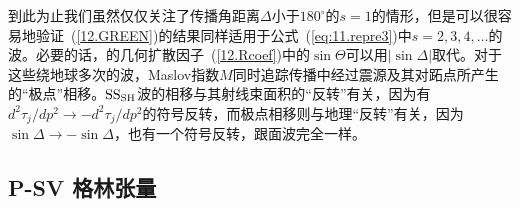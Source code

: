 到此为止我们虽然仅仅关注了传播角距离$\Delta$小于$180^{\circ}$的$s=1$的情形，但是可以很容易地验证~(\ref{12.GREEN})的结果同样适用于公式~(\ref{eq:11.repre3})中$s=2,3,4,\ldots$的波。必要的话，的几何扩散因子~(\ref{12.Rcoef})中的$\sin\Theta$可以用$|\!\sin\Delta|$取代。对于这些绕地球多次的波，Maslov指数$M$同时追踪传播中经过震源及其对跖点所产生的“极点”相移。${\rm SS}_{\rm SH}$波的相移与其射线束面积的“反转”有关，因为有$d^2\tau_j/dp^2\rightarrow -d^2\tau_j/dp^2$的符号反转，而极点相移则与地理“反转”有关，因为$\sin\Delta\rightarrow-\sin\Delta$，也有一个符号反转，跟面波完全一样。
%
%

\subsection{P-SV 格林张量}
%
%

